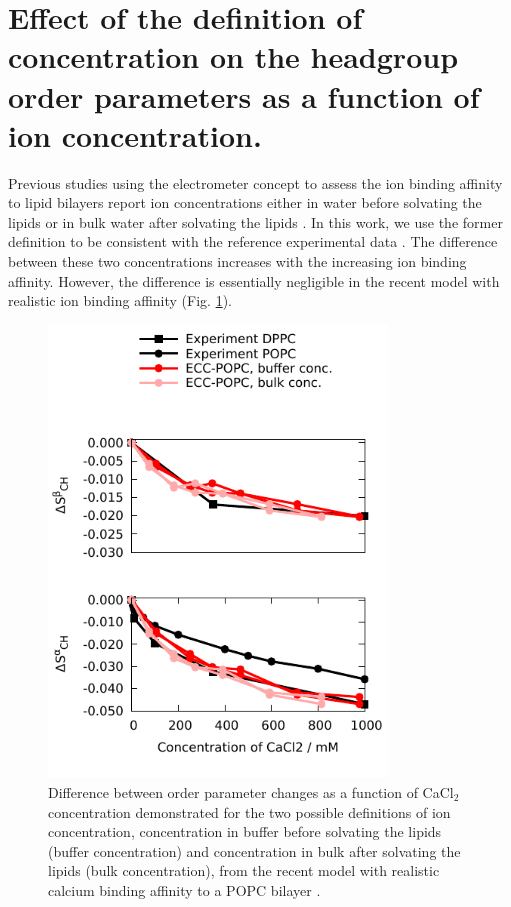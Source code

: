 \documentclass[journal=jpcbfk]{achemso}
\begin{document}
\section{Effect of the definition of concentration on the headgroup order parameters as a function of ion concentration.}\label{concentrationDEFsection}
Previous studies using the electrometer concept to assess the ion binding affinity to lipid
bilayers report ion concentrations either in water before solvating the lipids \cite{akutsu81,roux90,catte16}
or in bulk water after solvating the lipids \cite{altenbach84,melcr18}.
In this work, we use the former definition to be consistent with the reference
experimental data \cite{roux90}. The difference between these two concentrations increases
with the increasing ion binding affinity. However, the difference is essentially negligible
in the recent model \cite{melcr18} with realistic ion binding affinity (Fig. \ref{concentrationDEFfigure}).
\begin{figure}[]
  \centering
  \includegraphics[width=9.0cm]{../Figs/OP_ECC_POPC_DPPC_water_conc2_dppc_bulk.pdf}
  \caption{\label{concentrationDEFfigure}
    Difference between order parameter changes as a function of CaCl$_2$ concentration demonstrated
    for the two possible definitions of ion concentration, concentration in buffer before solvating the
    lipids (buffer concentration) and concentration in bulk after solvating the lipids (bulk concentration),
    from the recent model with realistic calcium binding affinity to a POPC bilayer \cite{melcr18}. 
}
\end{figure}
\end{document}
